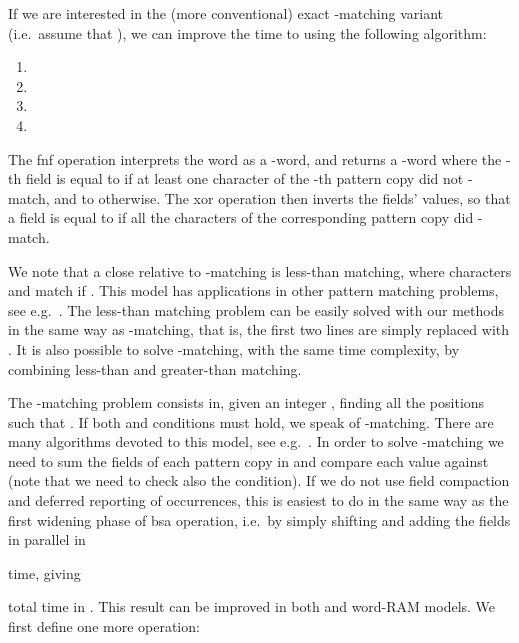 \documentclass{llncs}
\def \bxor{\textsf{xor}\xspace}
\newcommand{\fword}[1]{-word}
\begin{document}
If we are interested in the (more conventional) exact -matching variant
(i.e.\ assume that ), we can improve
the time to  using the following algorithm:
\begin{enumerate}
\item 
\item 
\item 
\item 
\end{enumerate}

The \textsf{fnf} operation interprets the word  as a
\fword{m\log\sigma}, and returns a \fword{m\log\sigma} where
the -th field is equal to  if at least one character of
the -th pattern copy did not -match, and to  otherwise.
The \bxor operation then inverts the fields' values, so that a field is
equal to  if all the characters of the
corresponding pattern copy did -match.

We note that a close relative to -matching is less-than matching, where characters
 and  match if .
This model has applications in other pattern matching problems, see e.g.\
\cite{DBLP:conf/focs/AmirALLL97}.
The less-than matching problem can be easily solved with our methods in the same way as
-matching, that is,
the first two lines are simply replaced with
. It is also possible to solve
-matching, with the same time complexity, by combining less-than and greater-than matching.

The -matching problem consists in, given an integer
, finding all the positions  such that . If both  and 
conditions must hold, we speak of -matching. There
are many algorithms devoted to this model, see
e.g.\ \cite{CINPSjda04}. In order to solve -matching
we need to sum the fields of each pattern copy in  and
compare each value against  (note that we need to check also
the  condition). If we do not use field compaction and
deferred reporting of occurrences, this is easiest to do in the same
way as the first widening phase of \textsf{bsa} operation, i.e.\ by
simply shifting and adding the fields in parallel in

time, giving

total time in .
This result can be improved in both  and word-RAM models.
We first define one more operation:
\end{document}
